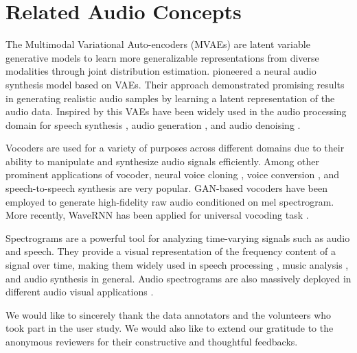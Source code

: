 \section{Related Audio Concepts} 
\label{sec: related audio concepts}
The Multimodal Variational Auto-encoders (MVAEs) are latent variable generative models to learn more generalizable representations from diverse modalities through joint distribution estimation. \citet{arik2018neural} pioneered a neural audio synthesis model based on VAEs. Their approach demonstrated promising results in generating realistic audio samples by learning a latent representation of the audio data. Inspired by this VAEs have been widely used in the audio processing domain for speech synthesis \cite{liu2021vara, zhang2019learning, tan2024naturalspeech}, audio generation \cite{jiang2020transformer, tango, caillon2021rave}, and audio denoising \cite{sadeghi2020audio, bando2020adaptive}. 

Vocoders are used for a variety of purposes across different domains due to their ability to manipulate and synthesize audio signals efficiently. Among other prominent applications of vocoder, neural voice cloning \cite{arik2018neural, jia2018transfer}, voice conversion \cite{liu2018wavenet}, and speech-to-speech synthesis \cite{jia1904direct} are very popular. GAN-based vocoders \cite{kong2020hifi} have been employed to generate high-fidelity raw audio conditioned on mel spectrogram. More recently, WaveRNN \cite{kalchbrenner2018efficient} has been applied for universal vocoding task \cite{lorenzo2018towards, paul2020speaker, jiao2021universal}.

Spectrograms are a powerful tool for analyzing time-varying signals such as audio and speech. They provide a visual representation of the frequency content of a signal over time, making them widely used in speech processing \cite{michelsanti2021overview, chuang2022improved, seo2023avformer}, music analysis \cite{melody, mousai}, and audio synthesis \cite{adverb, makeanaudio, tango, audit, audioldm} in general. Audio spectrograms are also massively deployed in different audio visual applications \cite{adverb, park2024can, sung2023sound}.

\vspace{0.2in}
 We would like to sincerely thank the data annotators and the volunteers who took part in the user study. We would also like to extend our gratitude to the anonymous reviewers for their constructive and thoughtful feedbacks.

